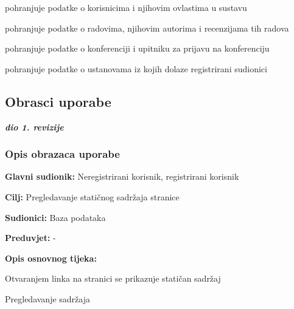 \begin{packed_enum}
				\item {}

				\begin{packed_enum}

					\item pohranjuje podatke o korisnicima i njihovim ovlastima u sustavu
					\item pohranjuje podatke o radovima, njihovim autorima i recenzijama tih radova
					\item pohranjuje podatke o konferenciji i upitniku za prijavu na konferenciju
					\item pohranjuje podatke o ustanovama iz kojih dolaze registrirani sudionici

				\end{packed_enum}
					
			\end{packed_enum}
			
			\eject 
			
			
				
			\subsection{Obrasci uporabe}
				
				\textbf{\textit{dio 1. revizije}}
				
				\subsubsection{Opis obrazaca uporabe}
					
					\noindent {}
					\begin{packed_item}
	
						\item \textbf{Glavni sudionik: } Neregistrirani korisnik, registrirani korisnik
						\item  \textbf{Cilj:} Pregledavanje statičnog sadržaja stranice
						\item  \textbf{Sudionici:} Baza podataka
						\item  \textbf{Preduvjet:} -
						\item  \textbf{Opis osnovnog tijeka:}
						
						\item[] \begin{packed_enum}
	
							\item Otvaranjem linka na stranici se prikazuje statičan sadržaj
							\item Pregledavanje sadržaja
						\end{packed_enum}
						

					\end{packed_item}


